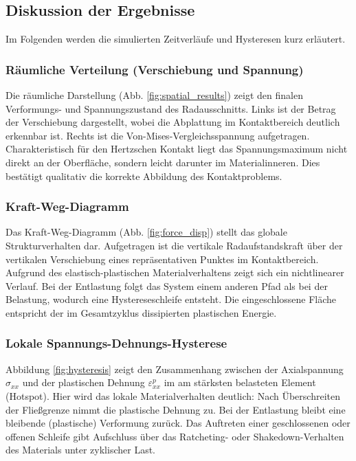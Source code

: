 \subsection{Diskussion der Ergebnisse}

Im Folgenden werden die simulierten Zeitverläufe und Hysteresen kurz erläutert.

\subsubsection{Räumliche Verteilung (Verschiebung und Spannung)}
Die räumliche Darstellung (Abb. \ref{fig:spatial_results}) zeigt den finalen Verformungs- und Spannungszustand des Radausschnitts.
Links ist der Betrag der Verschiebung dargestellt, wobei die Abplattung im Kontaktbereich deutlich erkennbar ist.
Rechts ist die Von-Mises-Vergleichsspannung aufgetragen. Charakteristisch für den Hertzschen Kontakt liegt das Spannungsmaximum nicht direkt an der Oberfläche, sondern leicht darunter im Materialinneren. Dies bestätigt qualitativ die korrekte Abbildung des Kontaktproblems.

\subsubsection{Kraft-Weg-Diagramm}
Das Kraft-Weg-Diagramm (Abb. \ref{fig:force_disp}) stellt das globale Strukturverhalten dar. Aufgetragen ist die vertikale Radaufstandskraft über der vertikalen Verschiebung eines repräsentativen Punktes im Kontaktbereich. Aufgrund des elastisch-plastischen Materialverhaltens zeigt sich ein nichtlinearer Verlauf. Bei der Entlastung folgt das System einem anderen Pfad als bei der Belastung, wodurch eine Hystereseschleife entsteht. Die eingeschlossene Fläche entspricht der im Gesamtzyklus dissipierten plastischen Energie.

\subsubsection{Lokale Spannungs-Dehnungs-Hysterese}
Abbildung \ref{fig:hysteresis} zeigt den Zusammenhang zwischen der Axialspannung $\sigma_{xx}$ und der plastischen Dehnung $\varepsilon^p_{xx}$ im am stärksten belasteten Element (Hotspot). Hier wird das lokale Materialverhalten deutlich: Nach Überschreiten der Fließgrenze nimmt die plastische Dehnung zu. Bei der Entlastung bleibt eine bleibende (plastische) Verformung zurück. Das Auftreten einer geschlossenen oder offenen Schleife gibt Aufschluss über das Ratcheting- oder Shakedown-Verhalten des Materials unter zyklischer Last.

